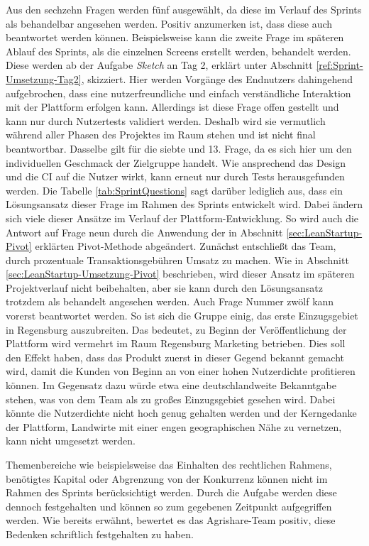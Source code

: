 Aus den sechzehn Fragen werden fünf ausgewählt, da diese im Verlauf des Sprints als behandelbar angesehen werden. Positiv anzumerken ist, dass diese auch beantwortet werden können. Beispielsweise kann die zweite Frage im späteren Ablauf des Sprints, als die einzelnen Screens erstellt werden, behandelt werden. Diese werden ab der Aufgabe \textit{Sketch} an Tag 2, erklärt unter Abschnitt \ref{ref:Sprint-Umsetzung-Tag2}, skizziert. Hier werden Vorgänge des Endnutzers dahingehend aufgebrochen, dass eine nutzerfreundliche und einfach verständliche Interaktion mit der Plattform erfolgen kann. Allerdings ist diese Frage offen gestellt und kann nur durch Nutzertests validiert werden. Deshalb wird sie vermutlich während aller Phasen des Projektes im Raum stehen und ist nicht final beantwortbar. Dasselbe gilt für die siebte und 13. Frage, da es sich hier um den individuellen Geschmack der Zielgruppe handelt. Wie ansprechend das Design und die \ac{CI} auf die Nutzer wirkt, kann erneut nur durch Tests herausgefunden werden. Die Tabelle \ref{tab:SprintQuestions} sagt darüber lediglich aus, dass ein Lösungsansatz dieser Frage im Rahmen des Sprints entwickelt wird. Dabei ändern sich viele dieser Ansätze im Verlauf der Plattform-Entwicklung. So wird auch die Antwort auf Frage neun durch die Anwendung der in Abschnitt \ref{sec:LeanStartup-Pivot} erklärten Pivot-Methode abgeändert. Zunächst entschließt das Team, durch prozentuale Transaktionsgebühren Umsatz zu machen. Wie in Abschnitt \ref{sec:LeanStartup-Umsetzung-Pivot} beschrieben, wird dieser Ansatz im späteren Projektverlauf nicht beibehalten, aber sie kann durch den Lösungsansatz trotzdem als behandelt angesehen werden. Auch Frage Nummer zwölf kann vorerst beantwortet werden. So ist sich die Gruppe einig, das erste Einzugsgebiet in Regensburg auszubreiten. Das bedeutet, zu Beginn der Veröffentlichung der Plattform wird vermehrt im Raum Regensburg Marketing betrieben. Dies soll den Effekt haben, dass das Produkt zuerst in dieser Gegend bekannt gemacht wird, damit die Kunden von Beginn an von einer hohen Nutzerdichte profitieren können. Im Gegensatz dazu würde etwa eine deutschlandweite Bekanntgabe stehen, was von dem Team als zu großes Einzugsgebiet gesehen wird. Dabei könnte die Nutzerdichte nicht hoch genug gehalten werden und der Kerngedanke der Plattform, Landwirte mit einer engen geographischen Nähe zu vernetzen, kann nicht umgesetzt werden. 

Themenbereiche wie beispielsweise das Einhalten des rechtlichen Rahmens, benötigtes Kapital oder Abgrenzung von der Konkurrenz können nicht im Rahmen des Sprints berücksichtigt werden. Durch die Aufgabe werden diese dennoch festgehalten und können so zum gegebenen Zeitpunkt aufgegriffen werden. Wie bereits erwähnt, bewertet es das Agrishare-Team positiv, diese Bedenken schriftlich festgehalten zu haben.

